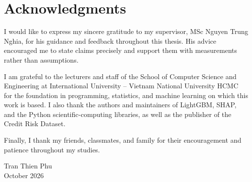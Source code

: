 \chapter*{Acknowledgments}

I would like to express my sincere gratitude to my supervisor, MSc Nguyen Trung
Nghia, for his guidance and feedback throughout this thesis. His advice
encouraged me to state claims precisely and support them with measurements
rather than assumptions.

I am grateful to the lecturers and staff of the School of Computer Science and
Engineering at International University -- Vietnam National University HCMC
for the foundation in programming, statistics, and machine learning on which
this work is based. I also thank the authors and maintainers of LightGBM, SHAP,
and the Python scientific-computing libraries, as well as the publisher of the
Credit Risk Dataset.

Finally, I thank my friends, classmates, and family for their encouragement and
patience throughout my studies.

\vspace{1cm}
\noindent Tran Thien Phu\\
\noindent October 2026

